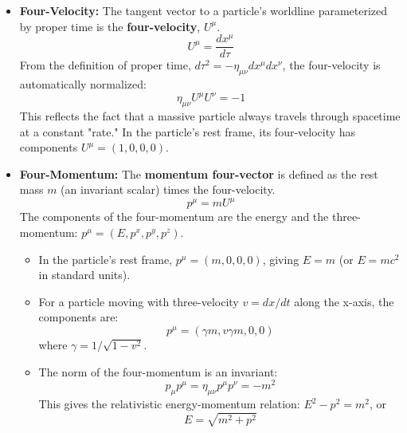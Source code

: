 \documentclass[11pt, a4paper]{report}
\begin{document}
\begin{itemize}
    \item \textbf{Four-Velocity:} The tangent vector to a particle's worldline parameterized by proper time is the \textbf{four-velocity}, $U^\mu$.
    \begin{equation}
        U^\mu = \frac{dx^\mu}{d\tau}
    \end{equation}
    From the definition of proper time, $d\tau^2 = -\eta_{\mu\nu}dx^\mu dx^\nu$, the four-velocity is automatically normalized:
    \begin{equation}
        \eta_{\mu\nu}U^\mu U^\nu = -1
    \end{equation}
    This reflects the fact that a massive particle always travels through spacetime at a constant "rate." In the particle's rest frame, its four-velocity has components $U^\mu = (1, 0, 0, 0)$.

    \item \textbf{Four-Momentum:} The \textbf{momentum four-vector} is defined as the rest mass $m$ (an invariant scalar) times the four-velocity.
    \begin{equation}
        p^\mu = mU^\mu
    \end{equation}
    The components of the four-momentum are the energy and the three-momentum: $p^\mu = (E, p^x, p^y, p^z)$.
    \begin{itemize}
        \item In the particle's rest frame, $p^\mu = (m, 0, 0, 0)$, giving $E=m$ (or $E=mc^2$ in standard units).
        \item For a particle moving with three-velocity $v = dx/dt$ along the x-axis, the components are:
        \begin{equation}
            p^\mu = (\gamma m, v\gamma m, 0, 0)
        \end{equation}
        where $\gamma = 1/\sqrt{1-v^2}$.
        \item The norm of the four-momentum is an invariant:
        \begin{equation}
            p_\mu p^\mu = \eta_{\mu\nu}p^\mu p^\nu = -m^2
        \end{equation}
        This gives the relativistic energy-momentum relation: $E^2 - p^2 = m^2$, or
        \begin{equation}
            E = \sqrt{m^2 + p^2}
        \end{equation}
    \end{itemize}
\end{itemize}
\end{document}
